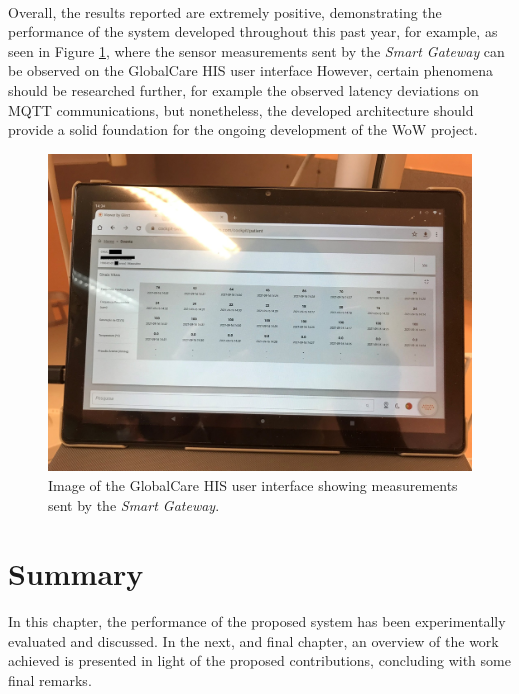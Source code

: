 \paragraph{} Overall, the results reported are extremely positive, demonstrating the performance of the system developed throughout this past year, for example, as seen in Figure \ref{fig:glintt-viewer}, where the sensor measurements sent by the \textit{Smart Gateway} can be observed on the GlobalCare \acs{HIS} user interface However, certain phenomena should be researched further, for example the observed latency deviations on \acs{MQTT} communications, but nonetheless, the developed architecture should provide a solid foundation for the ongoing development of the \acs{WoW} project.

\begin{figure}[H]
    \centering
    \includegraphics[width=.85\linewidth]{images/hospital-viewer.jpg}
    \caption{Image of the GlobalCare \acs{HIS} user interface showing measurements sent by the \textit{Smart Gateway}.}
    \label{fig:glintt-viewer}
\end{figure}

\section{Summary}
In this chapter, the performance of the proposed system has been experimentally evaluated and discussed. 
In the next, and final chapter, an overview of the work achieved is presented in light of the proposed contributions, concluding with some final remarks.